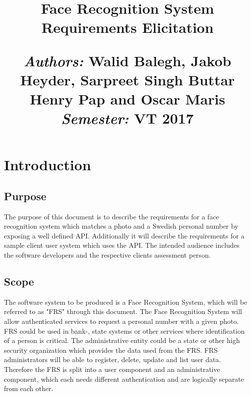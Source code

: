 \documentclass[a4paper,11pt]{article}
\title{	
\vspace{-8cm}
\begin{flushleft}
    \vspace{10cm}
    \normalfont \normalsize
    \vspace{-1.3cm}
\end{flushleft}
\vspace{3cm}
\begin{flushleft}
    \huge Face Recognition System \\ 
    \LARGE  Requirements Elicitation\\
\end{flushleft}
\null
\vfill
\begin{minipage}{\textwidth}
\begin{flushleft} \large
\emph{Authors:} Walid Balegh, Jakob Heyder, Sarpreet Singh Buttar \\ \hspace{45pt} Henry Pap and Oscar Maris \\ %
\emph{Semester:} VT 2017\\ %
\end{flushleft}
\end{minipage}
}
\date{}
\begin{document}
\maketitle





\newpage

\section{Introduction}

\subsection{Purpose}
The purpose of this document is to describe the requirements for a face recognition system which matches a photo and a Swedish personal number by exposing a well defined API. Additionally it will describe the requirements for a sample client user system which uses the API.
\newline
\noindent
The intended audience includes the software developers and the respective clients assessment person.

\subsection{Scope}

The software system to be produced is a Face Recognition System, which will be referred  to as "FRS" through this document.
\newline
\noindent
The Face Recognition System will allow authenticated services to request a personal number with a given photo.
FRS could be used in bank-, state systems or other services where identification of a person is critical.
The administrative entity could be a state or other high security organization which provides the data used from the FRS.
FRS administrators will be able to register, delete, update and list user data.
Therefore the FRS is split into a user component and an administrative component, which each needs different authentication and are logically separate from each other.
\end{document}
